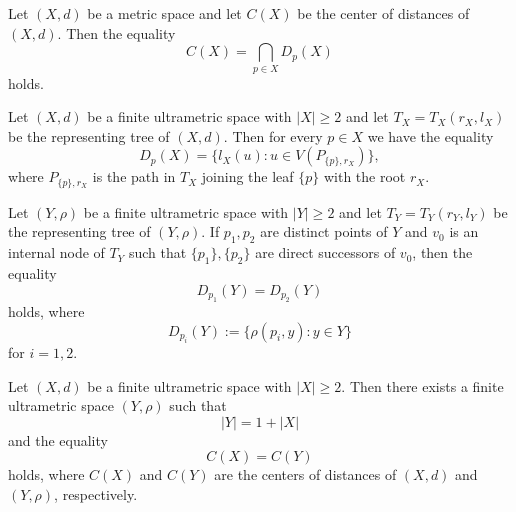 \documentclass[10pt,a4paper]{amsart}
\begin{document}
\begin{Proposition}\label{ugrdd}
Let $(X,d)$ be a metric space and let $C(X)$ be the center of distances of $(X,d)$. Then the equality 
\begin{equation*}
C(X) = \bigcap_{p \in X} D_p(X) 
\end{equation*}
holds.
\end{Proposition}

\begin{Corollary}\label{sefugi}
Let $(X,d)$ be a finite  ultrametric space with $|X|\geq 2$ and let 
\(
T_X=T_X(r_X,l_X)
\)
be the representing tree of \((X,d)\).
Then for every $p\in X$  we have the equality
\begin{equation}
    \label{imgt}
D_p(X)=\{l_X(u) : u \in V(P_{\{p\},r_X})\},
\end{equation}
where \(P_{\{p\},r_X}\) is the path in \(T_X\) joining the leaf \(\{p\}\) with the root \(r_X\).
\end{Corollary}

\begin{Lemma}\label{sabra}
Let $(Y,\rho)$ be a finite ultrametric space with $|Y|\ge 2$ and let $T_Y=T_Y(r_Y,l_Y)$ be the representing tree of $(Y,\rho)$. If $p_1,p_2$ are distinct points of $Y$ and $v_0$ is an internal node of $T_Y$ such that $\{p_1\},\{p_2\}$ are direct successors of $v_0$, then the equality
\begin{equation}
\label{kar1}
D_{p_1}(Y)=D_{p_2}(Y)
\end{equation}
holds, where
\[
D_{p_i}(Y):=\{\rho(p_i,y):y\in Y\} 
\]
for $i=1,2.$
\end{Lemma}

\begin{Proposition}\label{woorf}
Let $(X,d)$ be a finite ultrametric space with $|X|\ge 2$. Then there exists a finite ultrametric space $(Y,\rho)$ such that
\begin{equation}
    \label{ned}
|Y|=1+|X|
\end{equation}
and  the equality
\begin{equation}\label{gaf1}
C(X)=C(Y)
\end{equation}
holds, where $C(X)$ and $C(Y)$ are the centers of distances of $(X,d)$ and $(Y,\rho)$, respectively.
\end{Proposition}
\end{document}
